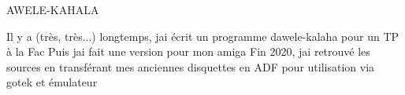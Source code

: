 \label{index_md_README}%
%
 AWELE-\/\+KAHALA

Il y a (très, très...) longtemps, j\textquotesingle{}ai écrit un programme d\textquotesingle{}awele-\/kalaha pour un TP à la Fac Puis j\textquotesingle{}ai fait une version pour mon amiga Fin 2020, j\textquotesingle{}ai retrouvé les sources en transférant mes anciennes disquettes en ADF pour utilisation via gotek et émulateur 